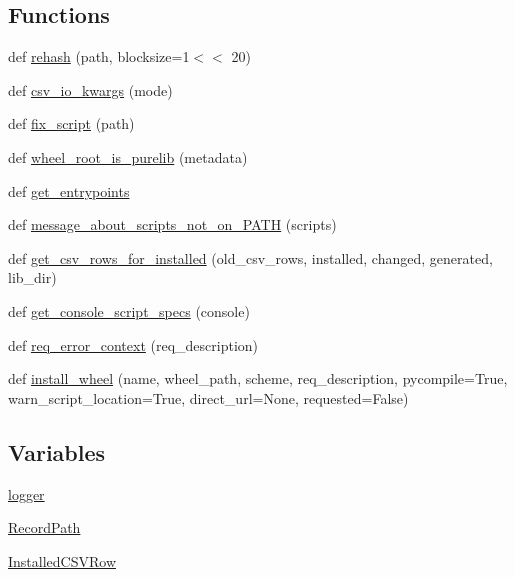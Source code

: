\subsection*{Functions}
\begin{DoxyCompactItemize}
\item 
def \hyperlink{namespacepip_1_1__internal_1_1operations_1_1install_1_1wheel_a44f28544cec7abc21fd7359d33710de7}{rehash} (path, blocksize=1$<$$<$ 20)
\item 
def \hyperlink{namespacepip_1_1__internal_1_1operations_1_1install_1_1wheel_a9fdfc84b0b3d56d65ab108349305aece}{csv\+\_\+io\+\_\+kwargs} (mode)
\item 
def \hyperlink{namespacepip_1_1__internal_1_1operations_1_1install_1_1wheel_af29b95fd607efbf97139389b7e374a22}{fix\+\_\+script} (path)
\item 
def \hyperlink{namespacepip_1_1__internal_1_1operations_1_1install_1_1wheel_a6039518537c5934929587be3c98ad2c8}{wheel\+\_\+root\+\_\+is\+\_\+purelib} (metadata)
\item 
def \hyperlink{namespacepip_1_1__internal_1_1operations_1_1install_1_1wheel_a704d5b164434af6e4ac4ad55d73206b0}{get\+\_\+entrypoints}
\item 
def \hyperlink{namespacepip_1_1__internal_1_1operations_1_1install_1_1wheel_a95576e0abb83220198635fee076c272a}{message\+\_\+about\+\_\+scripts\+\_\+not\+\_\+on\+\_\+\+P\+A\+TH} (scripts)
\item 
def \hyperlink{namespacepip_1_1__internal_1_1operations_1_1install_1_1wheel_a3ce373268f0c58e6200a83f5cf011178}{get\+\_\+csv\+\_\+rows\+\_\+for\+\_\+installed} (old\+\_\+csv\+\_\+rows, installed, changed, generated, lib\+\_\+dir)
\item 
def \hyperlink{namespacepip_1_1__internal_1_1operations_1_1install_1_1wheel_a05db2d34068442e6e937bf4ea73a049a}{get\+\_\+console\+\_\+script\+\_\+specs} (console)
\item 
def \hyperlink{namespacepip_1_1__internal_1_1operations_1_1install_1_1wheel_a8fa65a14c0a2703563b2d4b54fdb8efd}{req\+\_\+error\+\_\+context} (req\+\_\+description)
\item 
def \hyperlink{namespacepip_1_1__internal_1_1operations_1_1install_1_1wheel_a2a206ecfa963eb599bec740849d711da}{install\+\_\+wheel} (name, wheel\+\_\+path, scheme, req\+\_\+description, pycompile=True, warn\+\_\+script\+\_\+location=True, direct\+\_\+url=None, requested=False)
\end{DoxyCompactItemize}
\subsection*{Variables}
\begin{DoxyCompactItemize}
\item 
\hyperlink{namespacepip_1_1__internal_1_1operations_1_1install_1_1wheel_a7ea6a5636c15a59204a7f90ab0a5bd3f}{logger}
\item 
\hyperlink{namespacepip_1_1__internal_1_1operations_1_1install_1_1wheel_aa83c7ecb8dd69b844ed57ed1fa3a7209}{Record\+Path}
\item 
\hyperlink{namespacepip_1_1__internal_1_1operations_1_1install_1_1wheel_abc61841c3e2aeebdb596030b6f827a62}{Installed\+C\+S\+V\+Row}
\end{DoxyCompactItemize}


